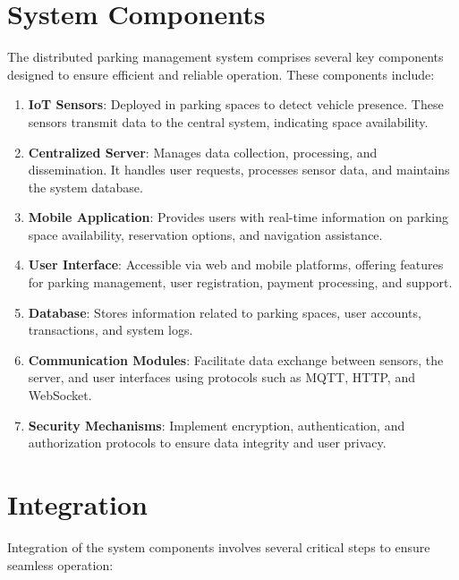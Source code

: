 \documentclass[oneside, 12pt, a4paper]{book}
\begin{document}
\section{System Components}
The distributed parking management system comprises several key components designed to ensure efficient and reliable operation. These components include:

\begin{enumerate}
  \item \textbf{\textbf{IoT Sensors}}: Deployed in parking spaces to detect vehicle presence. These sensors transmit data to the central system, indicating space availability.
  \item \textbf{\textbf{Centralized Server}}: Manages data collection, processing, and dissemination. It handles user requests, processes sensor data, and maintains the system database.
  \item \textbf{\textbf{Mobile Application}}: Provides users with real-time information on parking space availability, reservation options, and navigation assistance.
  \item \textbf{\textbf{User Interface}}: Accessible via web and mobile platforms, offering features for parking management, user registration, payment processing, and support.
  \item \textbf{\textbf{Database}}: Stores information related to parking spaces, user accounts, transactions, and system logs.
  \item \textbf{\textbf{Communication Modules}}: Facilitate data exchange between sensors, the server, and user interfaces using protocols such as MQTT, HTTP, and WebSocket.
  \item \textbf{\textbf{Security Mechanisms}}: Implement encryption, authentication, and authorization protocols to ensure data integrity and user privacy.
\end{enumerate}
\section{Integration}
Integration of the system components involves several critical steps to ensure seamless operation:
\end{document}

